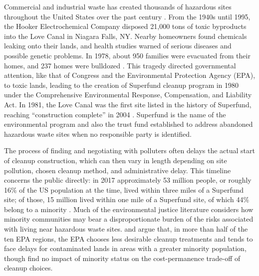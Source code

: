 \documentclass[12pt]{article}
\begin{document}
Commercial and industrial waste has created thousands of hazardous sites throughout the United States over the past century \parencite{EPA2011}. From the 1940s until 1995, the Hooker Electrochemical Company disposed 21,000 tons of toxic byproducts into the Love Canal in Niagara Falls, NY. Nearby homeowners found chemicals leaking onto their lands, and health studies warned of serious diseases and possible genetic problems. In 1978, about 950 families were evacuated from their homes, and 237 homes were bulldozed \parencite{Brown1979, NRDAR2016}. This tragedy directed governmental attention, like that of Congress and the Environmental Protection Agency (EPA), to toxic lands, leading to the creation of Superfund cleanup program in 1980 under the Comprehensive Environmental Response, Compensation, and Liability Act.  In 1981, the Love Canal was the first site listed in the history of Superfund, reaching ``construction complete'' in 2004 \parencite{USEPA2018}. Superfund is the name of the environmental program and also the trust fund established to address abandoned hazardous waste sites when no responsible party is identified. %

The process of finding and negotiating with polluters often delays the actual start of cleanup construction, which can then vary in length depending on site pollution, chosen cleanup method, and administrative delay. This timeline concerns the public directly: in 2017 approximately 53 million people, or roughly 16\% of the US population at the time, lived within three miles of a Superfund site; of those, 15 million lived within one mile of a Superfund site, of which 44\% belong to a minority \parencite{EPA2017}. Much of the environmental justice literature considers how minority communities may bear a disproportionate burden of the risks associated with living near hazardous waste sites. \textcite{lavelle1992unequal} and \textcite{bullard2008dumping} argue that, in more than half of the ten EPA regions, the EPA chooses less desirable cleanup treatments and tends to face delays for contaminated lands in areas with a greater minority population, though \textcite{Gupta1996} find no impact of minority status on the cost-permanence trade-off of cleanup choices. 
\end{document}
